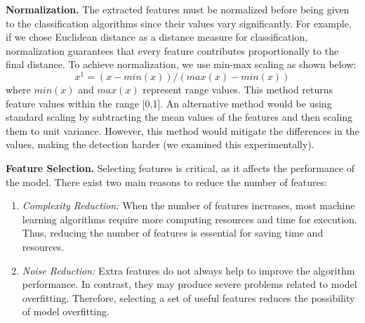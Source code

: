 \documentclass[runningheads]{llncs}
\begin{document}
\medskip \noindent \textbf{Normalization.}
The extracted features must be normalized before being given to the classification algorithms since their values vary significantly. For example, if we chose Euclidean distance as a distance measure for classification, normalization guarantees that every feature contributes proportionally to the final distance. To achieve normalization, we use min-max scaling as shown below:
%
\begin{equation}
\label{eq:normalization}
x^1 = (x - min(x))/(max(x) - min(x))
\end{equation}
%
where $min(x)$ and $max(x)$ represent range values. This method returns feature values within the range [0,1]. An alternative method would be using standard scaling by subtracting the mean values of the features and then scaling them to unit variance. However, this method would mitigate the differences in the values, making the detection harder (we examined this experimentally).


\medskip \noindent \textbf{Feature Selection.}
Selecting features is critical, as it affects the performance of the model. There exist two main reasons to reduce the number of features:

\begin{enumerate}
\item \textit{Complexity Reduction:} When the number of features increases, most machine learning algorithms require more computing resources and time for execution. Thus, reducing the number of features is essential for saving time and resources.

\item \textit{Noise Reduction:} Extra features do not always help to improve the algorithm performance. In contrast, they may produce severe problems related to model overfitting. Therefore, selecting a set of useful features reduces the possibility of model overfitting.
\end{enumerate}
\end{document}
